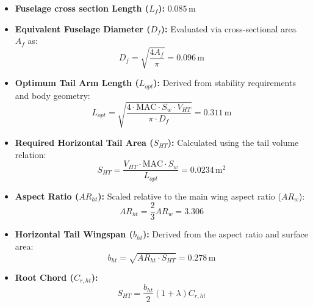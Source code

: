 \documentclass[11pt,a4paper]{article}
\begin{document}
\begin{itemize}
    \item \textbf{Fuselage cross section Length ($L_f$):} $0.085\,\text{m}$
    \item \textbf{Equivalent Fuselage Diameter ($D_f$):} Evaluated via cross-sectional area $A_f$ as:
    \begin{equation}
        D_f = \sqrt{\frac{4 A_f}{\pi}} = 0.096\,\text{m}
    \end{equation}
    \item \textbf{Optimum Tail Arm Length ($L_{opt}$):} Derived from stability requirements and body geometry:
    \begin{equation}
        L_{opt} = \sqrt{\frac{4 \cdot \text{MAC} \cdot S_w \cdot V_{HT}}{\pi \cdot D_f}} = 0.311\,\text{m}
    \end{equation}
    \item \textbf{Required Horizontal Tail Area ($S_{HT}$):} Calculated using the tail volume relation:
    \begin{equation}
        S_{HT} = \frac{V_{HT} \cdot \text{MAC} \cdot S_w}{L_{opt}} = 0.0234\,\text{m}^2
    \end{equation}
    \item \textbf{Aspect Ratio ($AR_{ht}$):} Scaled relative to the main wing aspect ratio ($AR_w$):
    \begin{equation}
        AR_{ht} = \frac{2}{3} AR_w = 3.306
    \end{equation}
    \item \textbf{Horizontal Tail Wingspan ($b_{ht}$):} Derived from the aspect ratio and surface area:
    \begin{equation}
        b_{ht} = \sqrt{AR_{ht} \cdot S_{HT}} = 0.278\,\text{m}
    \end{equation}
    \item \textbf{Root Chord ($C_{r,ht}$):}
    \begin{equation}
        S_{HT} = \frac{b_{ht}}{2} (1 + \lambda) C_{r,ht}
    \end{equation}
\end{itemize}
\end{document}
